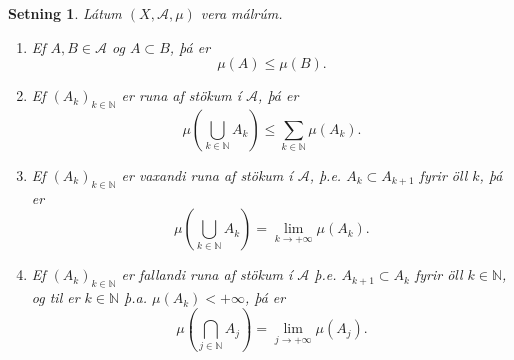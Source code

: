 \documentclass[a4paper,icelandic,11pt]{book}
\theoremstyle{plain}      \newtheorem{setn}{Setning}[chapter]
\theoremstyle{definition} \newtheorem{skilgr}[setn]{Skilgreining}
\theoremstyle{remark}     \newtheorem*{ath}{Athugasemd}
\newcommand{\N}{\mathbb N}
\begin{document}
\begin{setn}
  Látum $(X,\mathcal A,\mu)$ vera málrúm.
  \begin{enumerate}[(1)]
  \item Ef $A,B\in\mathcal A$ og $A\subset B$, þá er
    \[
    \mu(A)\le\mu(B).
    \]
  \item Ef $(A_{k})_{k\in\N}$ er runa af stökum í $\mathcal A$, þá er
    \[
    \mu\left(\bigcup_{k\in\N}A_{k}\right)
    \le \sum_{k\in\N}\mu(A_{k}).
    \]
  \item Ef $(A_{k})_{k\in\N}$ er vaxandi runa af stökum í
    $\mathcal{A}$, þ.e. $A_{k}\subset A_{k+1}$ fyrir öll $k$, þá er
    \[
    \mu\left(\bigcup_{k\in\N}A_{k}\right)
    = \lim_{k\to+\infty}\mu(A_{k}).
    \]
  \item Ef $(A_{k})_{k\in\N}$ er fallandi runa af stökum í
    $\mathcal{A}$ þ.e. $A_{k+1}\subset A_{k}$ fyrir öll $k\in\N$, og
    til er $k\in\N$ þ.a. $\mu(A_{k})<+\infty$, þá er
    \[
    \mu\left(\bigcap_{j\in\N}A_{j}\right)
    = \lim_{j\to+\infty}\mu(A_{j}).
    \]
  \end{enumerate}
\end{setn}
\end{document}
